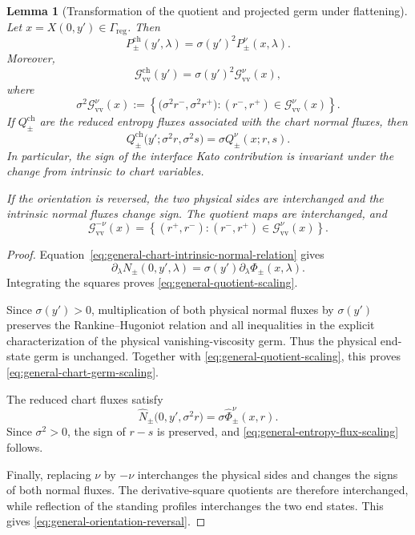 \documentclass[11pt]{amsart}
\numberwithin{equation}{section}
\theoremstyle{plain}
\newtheorem{lemma}[theorem]{Lemma}
\theoremstyle{definition}
\theoremstyle{remark}
\begin{document}
\begin{lemma}[Transformation of the quotient and projected germ under flattening]
\label{lem:general-chart-covariance}
Let \(x=X(0,y')\in\Gamma_{\mathrm{reg}}\). Then
\begin{equation}
\label{eq:general-quotient-scaling}
    P_\pm^{\mathrm{ch}}(y',\lambda)
    =
    \sigma(y')^2P_\pm^\nu(x,\lambda).
\end{equation}
Moreover,
\begin{equation}
\label{eq:general-chart-germ-scaling}
    \mathcal G_{\mathrm{vv}}^{\mathrm{ch}}(y')
    =
    \sigma(y')^2\mathcal G_{\mathrm{vv}}^\nu(x),
\end{equation}
where
\[
    \sigma^2\mathcal G_{\mathrm{vv}}^\nu(x)
    :=
    \left\{
        \bigl(\sigma^2r^-,\sigma^2r^+\bigr):
        (r^-,r^+)\in
        \mathcal G_{\mathrm{vv}}^\nu(x)
    \right\}.
\]
If \(Q_\pm^{\mathrm{ch}}\) are the reduced entropy fluxes associated with the
chart normal fluxes, then
\begin{equation}
\label{eq:general-entropy-flux-scaling}
    Q_\pm^{\mathrm{ch}}
    \bigl(y';\sigma^2r,\sigma^2s\bigr)
    =
    \sigma Q_\pm^\nu(x;r,s).
\end{equation}
In particular, the sign of the interface Kato contribution is invariant
under the change from intrinsic to chart variables.

If the orientation is reversed, the two physical sides are interchanged and
the intrinsic normal fluxes change sign. The quotient maps are interchanged,
and
\begin{equation}
\label{eq:general-orientation-reversal}
    \mathcal G_{\mathrm{vv}}^{-\nu}(x)
    =
    \left\{
        (r^+,r^-):
        (r^-,r^+)\in
        \mathcal G_{\mathrm{vv}}^\nu(x)
    \right\}.
\end{equation}
\end{lemma}

\begin{proof}
Equation~\eqref{eq:general-chart-intrinsic-normal-relation} gives
\[
    \partial_\lambda N_\pm(0,y',\lambda)
    =
    \sigma(y')
    \partial_\lambda\Phi_\pm(x,\lambda).
\]
Integrating the squares proves
\eqref{eq:general-quotient-scaling}.

Since \(\sigma(y')>0\), multiplication of both physical normal fluxes by
\(\sigma(y')\) preserves the Rankine--Hugoniot relation and all inequalities
in the explicit characterization of the physical vanishing-viscosity germ.
Thus the physical end-state germ is unchanged. Together with
\eqref{eq:general-quotient-scaling}, this proves
\eqref{eq:general-chart-germ-scaling}.

The reduced chart fluxes satisfy
\[
    \widehat N_\pm
    \bigl(0,y',\sigma^2r\bigr)
    =
    \sigma\widehat\Phi_\pm^\nu(x,r).
\]
Since \(\sigma^2>0\), the sign of \(r-s\) is preserved, and
\eqref{eq:general-entropy-flux-scaling} follows.

Finally, replacing \(\nu\) by \(-\nu\) interchanges the physical sides and
changes the signs of both normal fluxes. The derivative-square quotients are
therefore interchanged, while reflection of the standing profiles
interchanges the two end states. This gives
\eqref{eq:general-orientation-reversal}.
\end{proof}
\end{document}
